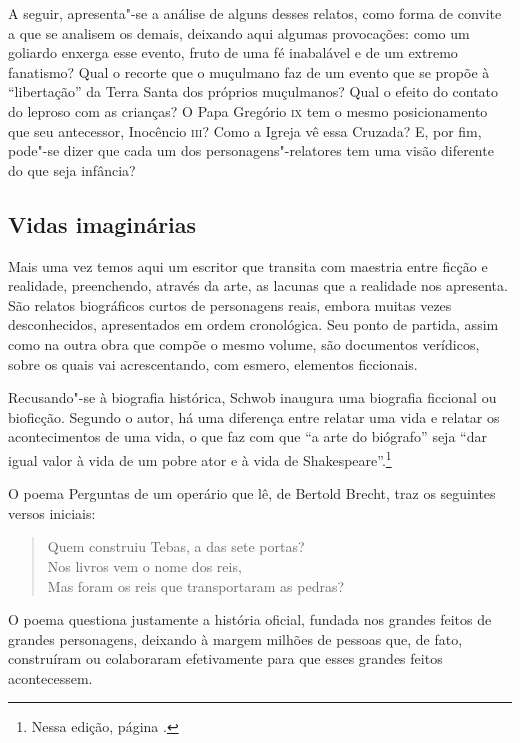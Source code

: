 A seguir, apresenta"-se a análise de alguns desses relatos, como forma de
convite a que se analisem os demais, deixando aqui algumas provocações:
como um goliardo enxerga esse evento, fruto de uma fé inabalável e de um
extremo fanatismo? Qual o recorte que o muçulmano faz de um evento que
se propõe à ``libertação'' da Terra Santa dos próprios muçulmanos? Qual
o efeito do contato do leproso com as crianças? O Papa Gregório \textsc{ix} tem o
mesmo posicionamento que seu antecessor, Inocêncio \textsc{iii}? Como a Igreja vê
essa Cruzada? E, por fim, pode"-se dizer que cada um dos
personagens"-relatores tem uma visão diferente do que seja infância?

\subsection{Vidas imaginárias}

Mais uma vez temos aqui um escritor que transita com maestria entre
ficção e realidade, preenchendo, através da arte, as lacunas que a
realidade nos apresenta. São relatos biográficos curtos de personagens
reais, embora muitas vezes desconhecidos, apresentados em ordem
cronológica. Seu ponto de partida, assim como na outra obra que compõe o
mesmo volume, são documentos verídicos, sobre os quais vai
acrescentando, com esmero, elementos ficcionais.

Recusando"-se à biografia histórica, Schwob inaugura uma biografia
ficcional ou bioficção. Segundo o autor, há uma diferença entre relatar
uma vida e relatar os acontecimentos de uma vida, o que faz com que ``a
arte do biógrafo'' seja ``dar igual valor à vida de um pobre ator e à
vida de Shakespeare''.\footnote{Nessa edição, página \pageref{vida}.}

O poema Perguntas de um operário que lê, de Bertold Brecht, traz os
seguintes versos iniciais:

\begin{verse}
Quem construiu Tebas, a das sete portas?\\
Nos livros vem o nome dos reis,\\
Mas foram os reis que transportaram as pedras?\\
\end{verse}

O poema questiona justamente a história oficial, fundada nos grandes
feitos de grandes personagens, deixando à margem milhões de pessoas que,
de fato, construíram ou colaboraram efetivamente para que esses grandes
feitos acontecessem.

